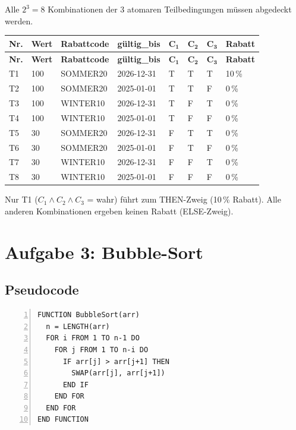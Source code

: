 \documentclass[
	fontsize=12pt,          %
	paper=a4,               %
	numbers=noenddot,       %
	listof=totoc,           %
	listof=entryprefix,     %
	listof=nochaptergap,    %
	bibliography=totoc,     %
	parskip=half,           %
	openany                 %
]{scrbook}
\begin{document}
Alle $2^3 = 8$ Kombinationen der 3 atomaren Teilbedingungen müssen abgedeckt werden.

\begin{longtable}{| p{0.5cm} | p{1.3cm} | p{2.2cm} | p{2.0cm} | p{0.7cm} | p{0.7cm} | p{0.7cm} | p{1.3cm} |}
	\hline
	\textbf{Nr.} & \textbf{Wert} & \textbf{Rabattcode} & \textbf{gültig\_bis} & $\mathbf{C_1}$ & $\mathbf{C_2}$ & $\mathbf{C_3}$ & \textbf{Rabatt} \\ \hline
	\endfirsthead
	\hline
	\textbf{Nr.} & \textbf{Wert} & \textbf{Rabattcode} & \textbf{gültig\_bis} & $\mathbf{C_1}$ & $\mathbf{C_2}$ & $\mathbf{C_3}$ & \textbf{Rabatt} \\ \hline
	\endhead
	\hline
	\endfoot
	T1 & 100 & SOMMER20 & 2026-12-31 & T & T & T & 10\,\% \\ \hline
	T2 & 100 & SOMMER20 & 2025-01-01 & T & T & F & 0\,\% \\ \hline
	T3 & 100 & WINTER10 & 2026-12-31 & T & F & T & 0\,\% \\ \hline
	T4 & 100 & WINTER10 & 2025-01-01 & T & F & F & 0\,\% \\ \hline
	T5 & 30 & SOMMER20 & 2026-12-31 & F & T & T & 0\,\% \\ \hline
	T6 & 30 & SOMMER20 & 2025-01-01 & F & T & F & 0\,\% \\ \hline
	T7 & 30 & WINTER10 & 2026-12-31 & F & F & T & 0\,\% \\ \hline
	T8 & 30 & WINTER10 & 2025-01-01 & F & F & F & 0\,\% \\ \hline
\end{longtable}

Nur T1 ($C_1 \wedge C_2 \wedge C_3$ = wahr) führt zum THEN-Zweig (10\,\% Rabatt).
Alle anderen Kombinationen ergeben keinen Rabatt (ELSE-Zweig).


\chapter*{Aufgabe 3: Bubble-Sort}

\section*{Pseudocode}

\begin{lstlisting}[language={},numbers=left,xleftmargin=2em]
FUNCTION BubbleSort(arr)
  n = LENGTH(arr)
  FOR i FROM 1 TO n-1 DO
    FOR j FROM 1 TO n-i DO
      IF arr[j] > arr[j+1] THEN
        SWAP(arr[j], arr[j+1])
      END IF
    END FOR
  END FOR
END FUNCTION
\end{lstlisting}
\end{document}

